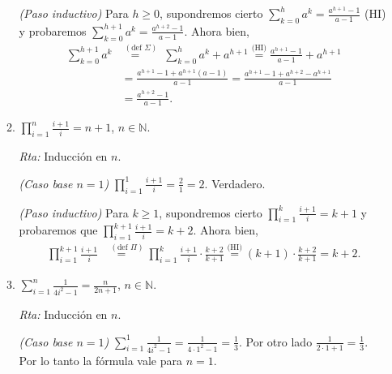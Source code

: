 \documentclass[12pt,spanish,makeidx]{amsbook}
\newcommand{\rta}{\noindent\textit{Rta: }}
\begin{document}
\begin{enumerate}
\begin{enumerate}
			\textit{(Paso inductivo) }  Para  $h \ge 0$,  supondremos cierto $\sum_{k=0}^h a^k = \frac{a^{h+1}-1}{a-1}$ (HI) y probaremos $\sum_{k=0}^{h+1} a^k = \frac{a^{h+2}-1}{a-1}$. Ahora bien, 
			\begin{align*}
				\sum_{k=0}^{h+1} a^k &\overset{(\text{def } \Sigma)}{=\quad} \;\sum_{k=0}^h a^k + a^{h+1} \overset{\text{(HI)}}{=} \frac{a^{h+1}-1}{a-1} +  a^{h+1} \\
				&= \frac{a^{h+1}-1 + a^{h+1}(a-1)}{a-1} = \frac{a^{h+1}-1 + a^{h+2}-a^{h+1}}{a-1} \\
				&=\frac{a^{h+2}-1}{a-1}.
			\end{align*}
			
			\item  $\displaystyle{ \prod_{i=1}^n \frac{i+1}{i} = n+1}$, $n\in \mathbb N$.
			
			\rta Inducción en $n$.
			
			\textit{(Caso base $n=1$) } $\prod_{i=1}^1 \frac{i+1}{i} = \frac{2}{1} = 2$. Verdadero.   
			
			\textit{(Paso inductivo) }  Para  $k \ge 1$,  supondremos cierto $\prod_{i=1}^k \frac{i+1}{i} = k+1$ y probaremos que $\prod_{i=1}^{k+1} \frac{i+1}{i} = k+2$. Ahora bien,
			\begin{align*}
				\prod_{i=1}^{k+1} \frac{i+1}{i} &\overset{(\text{def } \Pi)}{=\quad} \prod_{i=1}^k \frac{i+1}{i} \cdot \frac{k+2}{k+1} \overset{\text{(HI)}}{=} (k+1) \cdot \frac{k+2}{k+1} = k+2.
			\end{align*}
			
			
			\item $\displaystyle{ \sum_{i=1}^n \frac{1}{4i^2-1} = \frac{n}{2n+1}}$, $n\in \mathbb N$.
			
			\rta Inducción en $n$.
			
			\textit{(Caso base $n=1$) } $\sum_{i=1}^1 \frac{1}{4i^2-1} = \frac{1}{4\cdot 1^2-1} = \frac13$. Por otro lado $\frac{1}{2\cdot 1+1} = \frac13$. Por lo tanto la fórmula vale para $n=1$.  
			

\end{enumerate}
\end{enumerate}
\end{document}
